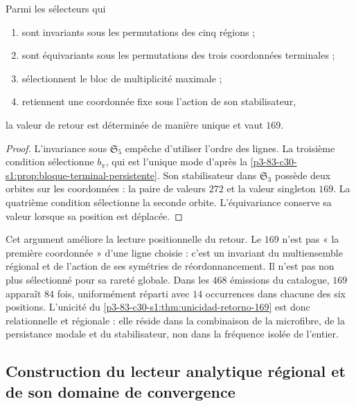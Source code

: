 \begin{theorem}
\label{p3-83-c30-s1:thm:unicidad-retorno-169}
Parmi les sélecteurs qui
\begin{enumerate}
  \item sont invariants sous les permutations des cinq régions ;
  \item sont équivariants sous les permutations des trois coordonnées
  terminales ;
  \item sélectionnent le bloc de multiplicité maximale ;
  \item retiennent une coordonnée fixe sous l'action de son stabilisateur,
\end{enumerate}
la valeur de retour est déterminée de manière unique et vaut \(169\).
\end{theorem}

\begin{proof}
L'invariance sous \(\mathfrak S_5\) empêche d'utiliser l'ordre des lignes. La
troisième condition sélectionne \(b_\pi\), qui est l'unique mode d'après la
\cref{p3-83-c30-s1:prop:bloque-terminal-persistente}. Son stabilisateur dans
\(\mathfrak S_3\) possède deux orbites sur les coordonnées : la paire de
valeurs \(272\) et la valeur singleton \(169\). La quatrième condition sélectionne la
seconde orbite. L'équivariance conserve sa valeur lorsque sa position est déplacée.
\end{proof}

Cet argument améliore la lecture positionnelle du retour. Le \(169\) n'est pas
« la première coordonnée » d'une ligne choisie : c'est un invariant du
multiensemble régional et de l'action de ses symétries de réordonnancement.
Il n'est pas non plus sélectionné pour sa rareté globale. Dans les \(468\) émissions du
catalogue, \(169\) apparaît \(84\) fois, uniformément réparti avec
\(14\) occurrences dans chacune des six positions. L'unicité du
\cref{p3-83-c30-s1:thm:unicidad-retorno-169} est donc relationnelle et régionale : elle réside
dans la combinaison de la microfibre, de la persistance modale et du stabilisateur, non dans la
fréquence isolée de l'entier.

\subsection{Construction du lecteur analytique régional et de son domaine de convergence}
\label{sec:s102:c38:2:3}


